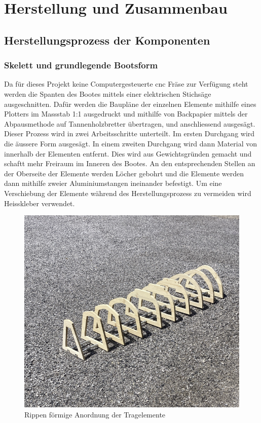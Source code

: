 

\chapter{Herstellung und Zusammenbau}
\label{chap:herstllung}

\section{Herstellungsprozess der Komponenten}
\subsection{Skelett und grundlegende Bootsform}
Da für dieses Projekt keine Computergesteuerte \ac{cnc} Fräse zur Verfügung steht werden die Spanten des Bootes mittels einer elektrischen Stichsäge ausgeschnitten. Dafür werden die Baupläne der einzelnen Elemente mithilfe eines Plotters im Massstab 1:1 ausgedruckt und  mithilfe von Backpapier mittels der Abpausmethode auf Tannenholzbretter übertragen, und anschliessend ausgesägt. Dieser Prozess wird in zwei Arbeitsschritte unterteilt. Im ersten Durchgang wird die äussere Form ausgesägt. In einem zweiten Durchgang wird dann Material von innerhalb der Elementen entfernt. Dies wird aus Gewichtsgründen gemacht und schaftt mehr Freiraum im Inneren des Bootes.
An den entsprechenden Stellen an der Oberseite der Elemente werden Löcher gebohrt und die Elemente werden dann mithilfe zweier Aluminiumstangen ineinander befestigt. Um eine Verschiebung der Elemente während des Herstellungsprozess zu vermeiden wird Heisskleber verwendet. 
\begin{figure}[H]
    \centering
    \includegraphics[width=1\linewidth]{rippe1.png}
    \caption{Rippen förmige Anordnung der Tragelemente}
    \label{fig:enter-label}
\end{figure}

